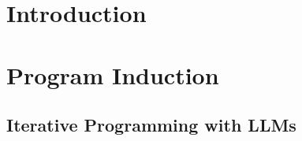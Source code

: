 \usepackage{lipsum}




\coverpage{\TITLE}{\SUBTITLE}{\AUTHOR}{\DATE}{\SUBJECT}

\newpage



\tableofcontents

\listoffigures

\listoftables


\printnomenclature

\part{Introduction}
\label{part:intro}

\newpage


\newpage


\newpage


\part{Program Induction}
\label{part:proginduction}

\newpage


\newpage


\newpage


\newpage


\newpage
\chapter{Iterative Programming with LLMs}
\label{ch:iterative}


